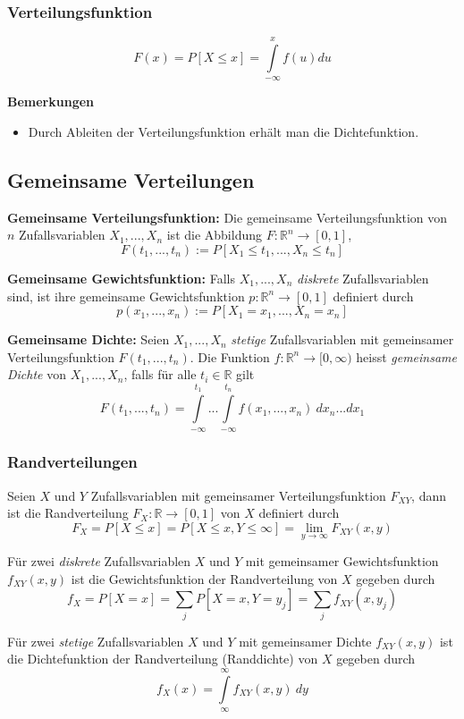 \documentclass[10pt,a4paper,twocolumn]{article}
\begin{document}
\subsubsection{Verteilungsfunktion}
\[
F(x) = P[X \leq x] = \int\limits_{-\infty}^{x}f(u)du
\]

\textbf{Bemerkungen}
\begin{itemize}
\item Durch Ableiten der Verteilungsfunktion erhält man die Dichtefunktion.
\end{itemize}

\subsection{Gemeinsame Verteilungen}

\textbf{Gemeinsame Verteilungsfunktion:} Die gemeinsame Verteilungsfunktion von $n$ Zufallsvariablen $X_1,...,X_n$ ist die Abbildung $F:\mathbb{R}^n\rightarrow [0,1]$,
\[
F(t_1,...,t_n):=P[X_1\leq t_1,...,X_n\leq t_n]
\]

\textbf{Gemeinsame Gewichtsfunktion:} Falls $X_1,...,X_n$ \emph{diskrete} Zufallsvariablen sind, ist ihre gemeinsame Gewichtsfunktion $p:\mathbb{R}^n\rightarrow [0,1]$ definiert durch
\[
p(x_1,...,x_n):=P[X_1=x_1,...,X_n=x_n]
\]

\textbf{Gemeinsame Dichte:} Seien $X_1,...,X_n$ \emph{stetige} Zufallsvariablen mit gemeinsamer Verteilungsfunktion $F(t_1,...,t_n)$. Die Funktion $f:\mathbb{R}^n\rightarrow [0,\infty)$ heisst \emph{gemeinsame Dichte} von $X_1,...,X_n$, falls für alle $t_i\in\mathbb{R}$ gilt
\[
F(t_1,...,t_n)=\int\limits_{-\infty}^{t_1}...\int\limits_{-\infty}^{t_n}f(x_1,...,x_n)\ dx_n...dx_1
\]

\subsubsection{Randverteilungen}
Seien $X$ und $Y$ Zufallsvariablen mit gemeinsamer Verteilungsfunktion $F_{XY}$, dann ist die Randverteilung $F_X:\mathbb{R}\rightarrow [0,1]$ von $X$ definiert durch
\[
F_X=P[X\leq x]=P[X\leq x,Y\leq\infty]=\lim_{y\to\infty}F_{XY}(x,y)
\]

Für zwei \emph{diskrete} Zufallsvariablen $X$ und $Y$ mit gemeinsamer Gewichtsfunktion $f_{XY}(x,y)$ ist die Gewichtsfunktion der Randverteilung von $X$ gegeben durch
\[
f_X=P[X=x]=\sum\limits_{j}P[X=x,Y=y_j]=\sum\limits_{j}f_{XY}(x,y_j)
\]

Für zwei \emph{stetige} Zufallsvariablen $X$ und $Y$ mit gemeinsamer Dichte $f_{XY}(x,y)$ ist die Dichtefunktion der Randverteilung (Randdichte) von $X$ gegeben durch
\[
f_X(x)=\int\limits_{\infty}^{\infty}f_{XY}(x,y)\ dy
\]
\end{document}
